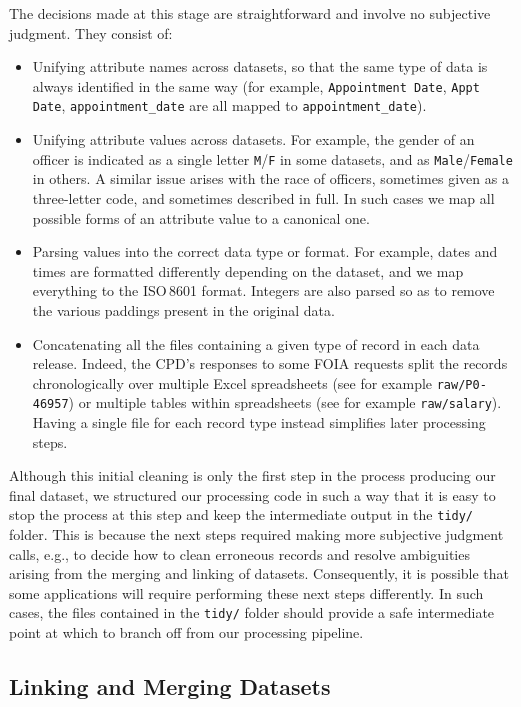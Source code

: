 The decisions made at this stage are straightforward and involve no subjective
judgment. They consist of:
\begin{itemize}
	\item Unifying attribute names across datasets, so that the same type of
		data is always identified in the same way (for example,
		\texttt{Appointment Date}, \texttt{Appt Date},
		\texttt{appointment\_date} are all mapped to
		\texttt{appointment\_date}).
	\item Unifying attribute values across datasets. For example, the gender of
		an officer is indicated as a single letter \texttt{M}/\texttt{F} in
		some datasets, and as \texttt{Male}/\texttt{Female} in others. A similar issue
		arises with the race of officers, sometimes given as a three-letter
		code, and sometimes described in full. In such cases we map all
		possible forms of an attribute value to a canonical one.
	\item Parsing values into the correct data type or format. For example,
		dates and times are formatted differently depending on the dataset, and
		we map everything to the ISO\,8601 format. Integers are also parsed so
		as to remove the various paddings present in the original data.
	\item Concatenating all the files containing a given type of record in each
		data release. Indeed, the CPD's responses to some FOIA requests split
		the records chronologically over multiple Excel spreadsheets (see for
		example \texttt{raw/P0-46957}) or multiple tables within spreadsheets
                (see for example \texttt{raw/salary}). Having a single file for each record
		type instead simplifies later processing steps.
\end{itemize}

Although this initial cleaning is only the first step in the process producing
our final dataset, we structured our processing code in such a way that it is
easy to stop the process at this step and keep the intermediate output in the
\texttt{tidy/} folder. This is because the next steps required making more
subjective judgment calls, e.g., to decide how to clean erroneous records and resolve
ambiguities arising from the merging and linking of datasets. Consequently, it
is possible that some applications will require performing these next steps
differently. In such cases, the files contained in the \texttt{tidy/} folder
should provide a safe intermediate point at which to branch off from our
processing pipeline.

\subsection{Linking and Merging Datasets}\label{sec:linking}

